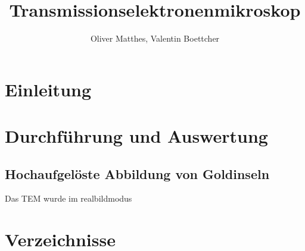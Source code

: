 \documentclass[slug=TEM, room=IFW, supervisor=?, coursedate=23.\ 01.\ 2020]{../../Lab_Report_LaTeX/lab_report}
\title{Transmissionselektronenmikroskop}
\author{Oliver Matthes, Valentin Boettcher}
\begin{document}
\maketitle

\section{Einleitung}
\label{sec:einl}

\section{Durchf\"uhrung und Auswertung}
\label{sec:durchaus}

\subsection{Hochaufgel\"oste Abbildung von Goldinseln}
\label{sec:hrtem}

Das TEM wurde im realbildmodus

\newpage
\section{Verzeichnisse}
\label{sec:literatur}

\listoffigures

\listoftables

\printbibliography
\end{document}
